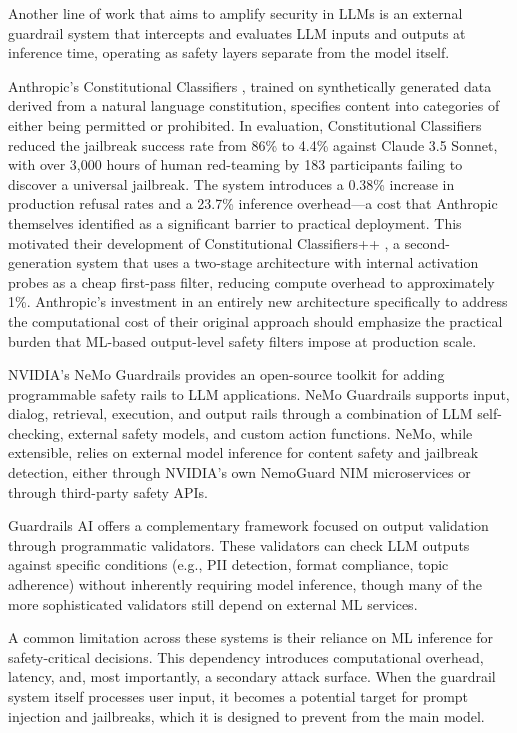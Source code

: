 \documentclass[11pt]{article}
\begin{document}
Another line of work that aims to amplify security in LLMs is an external guardrail system that
intercepts and evaluates LLM inputs and outputs at inference time, operating as safety layers
separate from the model itself.

Anthropic's Constitutional Classifiers \citep{sharma2025constitutional}, trained on synthetically generated data derived from
a natural language constitution, specifies content into categories of either being permitted or prohibited. In evaluation, Constitutional Classifiers reduced the jailbreak success rate from 86\% to 4.4\%
against Claude 3.5 Sonnet, with over 3,000 hours of human red-teaming by 183 participants failing
to discover a universal jailbreak. The system introduces a 0.38\% increase in production refusal
rates and a 23.7\% inference overhead---a cost that Anthropic themselves identified as a significant
barrier to practical deployment. This motivated their development of Constitutional Classifiers++
\citep{anthropic2025constitutionalpp}, a second-generation system that uses a two-stage architecture with internal activation probes
as a cheap first-pass filter, reducing compute overhead to approximately 1\%. Anthropic's investment in an entirely new architecture specifically to address the computational cost of their original
approach should emphasize the practical burden that ML-based output-level safety filters impose
at production scale.

NVIDIA's NeMo Guardrails \citep{rebedea2023nemo} provides an open-source toolkit for adding programmable
safety rails to LLM applications. NeMo Guardrails supports input, dialog, retrieval, execution,
and output rails through a combination of LLM self-checking, external safety models, and custom
action functions. NeMo, while extensible, relies on external model inference for content safety
and jailbreak detection, either through NVIDIA's own NemoGuard NIM microservices or through
third-party safety APIs.

Guardrails AI offers a complementary framework focused on output validation through programmatic validators. These validators can check LLM outputs against specific conditions (e.g.,
PII detection, format compliance, topic adherence) without inherently requiring model inference,
though many of the more sophisticated validators still depend on external ML services.

A common limitation across these systems is their reliance on ML inference for safety-critical
decisions. This dependency introduces computational overhead, latency, and, most importantly,
a secondary attack surface. When the guardrail system itself processes user input, it becomes a
potential target for prompt injection and jailbreaks, which it is designed to prevent from the main
model.
\end{document}
